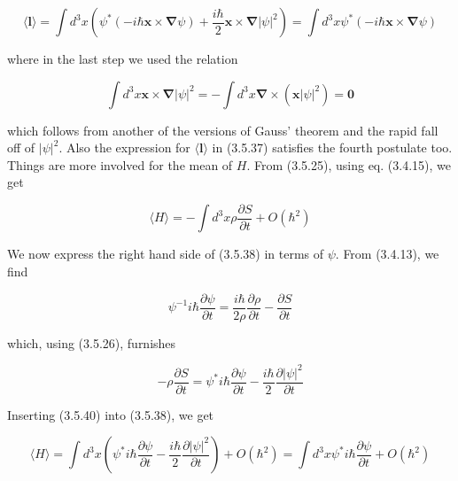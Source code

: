 \documentclass{article}
\begin{document}
\begin{equation*}
\langle\boldsymbol{l}\rangle=\int d^{3} x\left(\psi^{*}(-i \hbar \boldsymbol{x} \times \boldsymbol{\nabla} \psi)+\frac{i \hbar}{2} \boldsymbol{x} \times \boldsymbol{\nabla}|\psi|^{2}\right)=\int d^{3} x \psi^{*}(-i \hbar \boldsymbol{x} \times \boldsymbol{\nabla} \psi) \tag{3.5.36}
\end{equation*}
 
where in the last step we used the relation
 
\begin{equation*}
\int d^{3} x \boldsymbol{x} \times \boldsymbol{\nabla}|\psi|^{2}=-\int d^{3} x \boldsymbol{\nabla} \times\left(\boldsymbol{x}|\psi|^{2}\right)=\mathbf{0} \tag{3.5.37}
\end{equation*}
 
which follows from another of the versions of Gauss' theorem and the rapid fall off of $|\psi|^{2}$. Also the expression for $\langle\boldsymbol{l}\rangle$ in (3.5.37) satisfies the fourth postulate too. Things are more involved for the mean of $H$. From (3.5.25), using eq. (3.4.15), we get
 
\begin{equation*}
\langle H\rangle=-\int d^{3} x \rho \frac{\partial S}{\partial t}+O\left(\hbar^{2}\right) \tag{3.5.38}
\end{equation*}
 

We now express the right hand side of (3.5.38) in terms of $\psi$. From (3.4.13), we find
 
\begin{equation*}
\psi^{-1} i \hbar \frac{\partial \psi}{\partial t}=\frac{i \hbar}{2 \rho} \frac{\partial \rho}{\partial t}-\frac{\partial S}{\partial t} \tag{3.5.39}
\end{equation*}
 
which, using (3.5.26), furnishes
 
\begin{equation*}
-\rho \frac{\partial S}{\partial t}=\psi^{*} i \hbar \frac{\partial \psi}{\partial t}-\frac{i \hbar}{2} \frac{\partial|\psi|^{2}}{\partial t} \tag{3.5.40}
\end{equation*}
 

Inserting (3.5.40) into (3.5.38), we get
 
\begin{equation*}
\langle H\rangle=\int d^{3} x\left(\psi^{*} i \hbar \frac{\partial \psi}{\partial t}-\frac{i \hbar}{2} \frac{\partial|\psi|^{2}}{\partial t}\right)+O\left(\hbar^{2}\right)=\int d^{3} x \psi^{*} i \hbar \frac{\partial \psi}{\partial t}+O\left(\hbar^{2}\right) \tag{3.5.41}
\end{equation*}
 
\end{document}
